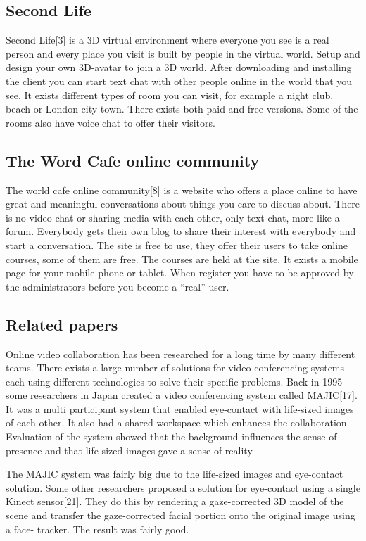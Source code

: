 \documentclass[12pt, titlepage]{article}
\begin{document}
\subsection{Second Life}
Second Life[3] is a 3D virtual environment where everyone you see is a real person and every place you visit is built by people in the virtual world. Setup and design your own 3D-avatar to join a 3D world. After downloading and installing the client you can start text chat with other people online in the world that you see. It exists different types of room you can visit, for example a night club, beach or London city town. There exists both paid and free versions. Some of the rooms also have voice chat to offer their visitors.
\subsection{The Word Cafe online community}
The world cafe online community[8] is a website who offers a place online to have great and meaningful conversations about things you care to discuss about. There is no video chat or sharing media with each other, only text chat, more like a forum. Everybody gets their own blog to share their interest with everybody and start a conversation. The site is free to use, they offer their users to take online courses, some of them are free. The courses are held at the site. It exists a mobile page for your mobile phone or tablet. When register you have to be approved by the administrators before you become a “real” user.

\subsection{Related papers}
Online video collaboration has been researched for a long time by many different teams. There exists a large number of solutions for video conferencing systems each using different technologies to solve their specific problems. Back in 1995 some researchers in Japan created a video conferencing system called MAJIC[17]. It was a multi participant system that enabled eye-contact with life-sized images of each other. It also had a shared workspace which enhances the collaboration. Evaluation of the system showed that the background influences the sense of presence and that life-sized images gave a sense of reality.

The MAJIC system was fairly big due to the life-sized images and eye-contact solution. Some other researchers proposed a solution for eye-contact using a single Kinect sensor[21]. They do this by rendering a gaze-corrected 3D model of the scene and transfer the gaze-corrected facial portion onto the original image using a face- tracker. The result was fairly good.
\end{document}
